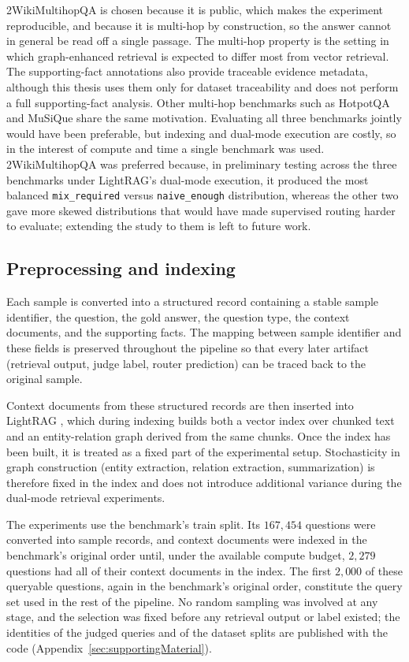 \documentclass[english, bibtex]{kththesis}               %
\numberwithin{listing}{chapter}
\providecommand{\DIFaddtex}[1]{{\protect\color{blue} \sf #1}} %
\providecommand{\DIFaddbegin}{} %
\providecommand{\DIFadd}[1]{\texorpdfstring{\DIFaddtex{#1}}{#1}} %
\begin{document}
2WikiMultihopQA is chosen because it is public, which makes the experiment reproducible, and because it is multi-hop by construction, so the answer cannot in general be read off a single passage. The multi-hop property is the setting in which graph-enhanced retrieval is expected to differ most from vector retrieval. The supporting-fact annotations also provide traceable evidence metadata, although this thesis uses them only for dataset traceability and does not perform a full supporting-fact analysis. Other multi-hop benchmarks such as HotpotQA and MuSiQue \cite{yang2018hotpotqa,trivedi2022musique} share the same motivation. Evaluating all three benchmarks jointly would have been preferable, but indexing and dual-mode execution are costly, so in the interest of compute and time a single benchmark was used. 2WikiMultihopQA was preferred because, in preliminary testing across the three benchmarks under LightRAG's dual-mode execution, it produced the most balanced \texttt{mix\_required} versus \texttt{naive\_enough} distribution, whereas the other two gave more skewed distributions that would have made supervised routing harder to evaluate; extending the study to them is left to future work.

\subsection{Preprocessing and indexing}
\label{sec:methodPreprocessing}

Each sample is converted into a structured record containing a stable sample identifier, the question, the gold answer, the question type, the context documents, and the supporting facts. The mapping between sample identifier and these fields is preserved throughout the pipeline so that every later artifact (retrieval output, judge label, router prediction) can be traced back to the original sample.

Context documents from these structured records are then inserted into LightRAG \cite{lightrag2024}, which during indexing builds both a vector index over chunked text and an entity-relation graph derived from the same chunks. Once the index has been built, it is treated as a fixed part of the experimental setup. Stochasticity in graph construction (entity extraction, relation extraction, summarization) is therefore fixed in the index and does not introduce additional variance during the dual-mode retrieval experiments.

\DIFaddbegin \DIFadd{The experiments use the benchmark's train split. Its $167{,}454$ questions were converted into sample records, and context documents were indexed in the benchmark's original order until, under the available compute budget, $2{,}279$ questions had all of their context documents in the index. The first $2{,}000$ of these queryable questions, again in the benchmark's original order, constitute the query set used in the rest of the pipeline. No random sampling was involved at any stage, and the selection was fixed before any retrieval output or label existed; the identities of the judged queries and of the dataset splits are published with the code (Appendix~\ref{sec:supportingMaterial}).
}
\end{document}

